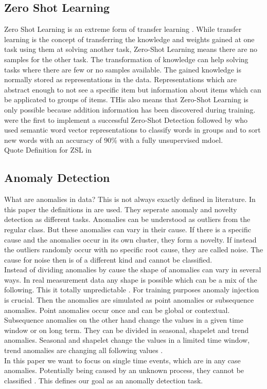 \subsection{Zero Shot Learning}
Zero Shot Learning is an extreme form of transfer learning \cite[S. 536]{goodfellow_deep_2016}. While transfer learning is the concept of transferring the knowledge and weights gained at one task using them at solving another task, Zero-Shot Learning means there are no samples for the other task. The transformation of knowledge can help solving tasks where there are few or no samples available. The gained knowledge is normally stored as representations in the data. Representations which are abstract enough to not see a specific item but information about items which can be applicated to groups of items. THis also means that Zero-Shot Learning is only possible because addition information has been discovered during training.\\
 were the first to implement a successful Zero-Shot Detection followed by  who used semantic word vector representations to classify words in groups and to sort new words with an accuracy of 90\% with a fully unsupervised mdoel.\\
Quote Definition for ZSL in \cite[S. 1532]{nivarthi_unified_2022}\\%
\subsection{Anomaly Detection}
What are anomalies in data? This is not always exactly defined in literature. In this paper the definitions in  are used. They seperate anomaly and novelty detection as different tasks. Anomalies can be understood as outliers from the regular class. But these anomalies can vary in their cause. If there is a specific cause and the anomalies occur in its own cluster, they form a novelty. If instead the outliers randomly occur with no specific root cause, they are called noise. The cause for noise then is of a different kind and cannot be classified.\\
Instead of dividing anomalies by cause the shape of anomalies can vary in several ways. In real measurement data any shape is possible which can be a mix of the following. This it totally unpredictable \cite{schwartz_maeday_2024}. For training purposes anomaly injection is crucial. Then the anomalies are simulated as point anomalies or subsequence anomalies. Point anomalies occur once and can be global or contextual. Subsequence anomalies on the other hand change the values in a given time window or on long term. They can be divided in seasonal, shapelet and trend anomalies. Seasonal and shapelet change the values in a limited time window, trend anomalies are changing all following values \cite[p. 9]{darban_carla_2024}.\\ %
In this paper we want to focus on single time events, which are in any case anomalies. Potentially being caused by an unknown process, they cannot be classified \cite{gruhl_novelty_2022}. This defines our goal as an anomally detection task.\\

